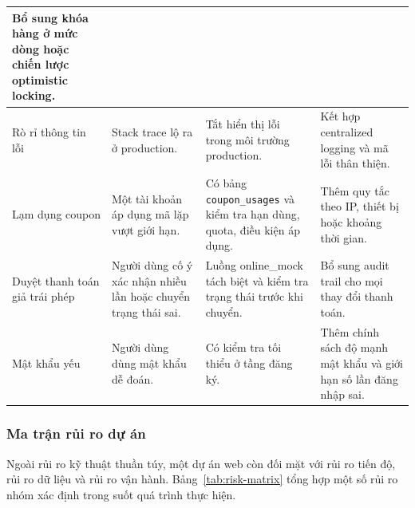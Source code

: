 \documentclass[11pt, a4paper]{article}
\begin{document}
\begin{longtable}{|p{3.5cm}|p{3.8cm}|p{3.8cm}|p{3.7cm}|}
    Bổ sung khóa hàng ở mức dòng hoặc chiến lược optimistic locking. \\ \hline
    Rò rỉ thông tin lỗi &
    Stack trace lộ ra ở production. &
    Tắt hiển thị lỗi trong môi trường production. &
    Kết hợp centralized logging và mã lỗi thân thiện. \\ \hline
    Lạm dụng coupon &
    Một tài khoản áp dụng mã lặp vượt giới hạn. &
    Có bảng \texttt{coupon\_usages} và kiểm tra hạn dùng, quota, điều kiện áp dụng. &
    Thêm quy tắc theo IP, thiết bị hoặc khoảng thời gian. \\ \hline
    Duyệt thanh toán giả trái phép &
    Người dùng cố ý xác nhận nhiều lần hoặc chuyển trạng thái sai. &
    Luồng online\_mock tách biệt và kiểm tra trạng thái trước khi chuyển. &
    Bổ sung audit trail cho mọi thay đổi thanh toán. \\ \hline
    Mật khẩu yếu &
    Người dùng dùng mật khẩu dễ đoán. &
    Có kiểm tra tối thiểu ở tầng đăng ký. &
    Thêm chính sách độ mạnh mật khẩu và giới hạn số lần đăng nhập sai. \\ \hline
\end{longtable}
\endgroup

\subsubsection{Ma trận rủi ro dự án}

Ngoài rủi ro kỹ thuật thuần túy, một dự án web còn đối mặt với rủi ro tiến độ,
rủi ro dữ liệu và rủi ro vận hành. Bảng~\ref{tab:risk-matrix} tổng hợp một số
rủi ro nhóm xác định trong suốt quá trình thực hiện.
\end{document}
